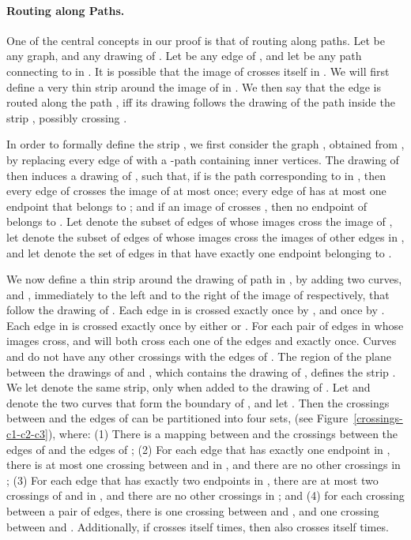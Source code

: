 \documentclass[twoside,leqno,twocolumn]{article}
\begin{document}
\paragraph{Routing along Paths.} One of the central concepts in our proof is  that of routing along paths. Let  be any graph, and  any drawing of . Let  be any edge of , and let  be any path connecting  to  in . It is possible that the image of  crosses itself in . We will first define a very thin strip  around the image of  in . We then say that the edge  is routed along the path , iff its drawing follows the drawing of the path  inside the strip , possibly crossing .

In order to formally define the strip , we first consider the graph , obtained from , by replacing every edge of  with a -path containing  inner vertices. The drawing  of  then induces a drawing  of , such that, if  is the path corresponding to   in , then every edge of  crosses the image of  at most once; every edge of  has at most one endpoint that belongs to ; and if an image of  crosses , then no endpoint of  belongs to . Let  denote the subset of edges of  whose images cross the image of , let  denote the subset of edges of  whose images cross the images of other edges in , and let  denote the set of edges in  that have exactly one endpoint belonging to .

We now define a thin strip  around the drawing of path  in , by adding two curves,  and , immediately to the left and to the right of the image of  respectively, that follow the drawing of . Each edge in  is crossed exactly once by , and once by . Each edge in  is crossed exactly once by either  or . For each pair  of edges in  whose images cross,  and  will both cross each one of the edges  and  exactly once. Curves  and  do not have any other crossings with the edges of . The region of the plane between the drawings of  and , which contains the drawing of , defines the strip . We let  denote the same strip, only when added to the drawing  of . Let  and  denote the two curves that form the boundary of , and let . Then the crossings between  and the edges of  can be partitioned into four sets,  (see Figure~\ref{crossings-c1-c2-c3}), where: (1) There is a  mapping between  and the crossings between the edges of  and the edges of ; (2) For each edge  that has exactly one endpoint in , there is at most one crossing between  and  in , and there are no other crossings in ; (3) For each edge  that has exactly two endpoints in , there are at most two crossings of  and  in , and there are no other crossings in ; and (4) for each crossing between a pair  of edges, there is one crossing between  and , and one crossing between  and . Additionally, if  crosses itself  times, then  also crosses itself  times.
\end{document}
